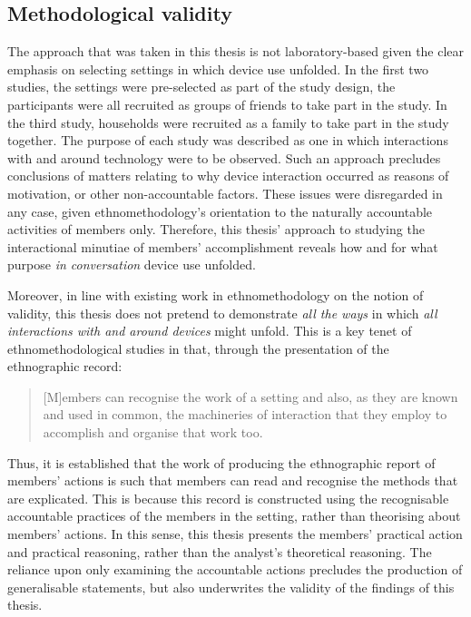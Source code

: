\subsection{Methodological validity}\label{sec:synopsis discussion method validity}
\begin{revisedsubmission}
The approach that was taken in this thesis is not laboratory-based given the clear emphasis on selecting settings in which device use unfolded.
In the first two studies, the settings were pre-selected as part of the study design, the participants were all recruited as groups of friends to take part in the study.
In the third study, households were recruited as a family to take part in the study together.
The purpose of each study was described as one in which interactions with and around technology were to be observed.
Such an approach precludes conclusions of matters relating to why device interaction occurred as reasons of motivation, or other non-accountable factors.
These issues were disregarded in any case, given ethnomethodology's orientation to the naturally accountable activities of members only.
Therefore, this thesis' approach to studying the interactional minutiae of members' accomplishment reveals how and for what purpose \textit{in conversation} device use unfolded.

Moreover, in line with existing work in ethnomethodology on the notion of validity, this thesis does not pretend to demonstrate \textit{all the ways} in which \textit{all interactions with and around devices} might unfold.
This is a key tenet of ethnomethodological studies in that, through the presentation of the ethnographic record:
\begin{quote}
    [M]embers can recognise the work of a setting and also, as they are known and used in common, the machineries of interaction that they employ to accomplish and organise that work too.
\end{quote}
Thus, it is established that the work of producing the ethnographic report of members' actions is such that members can read and recognise the methods that are explicated.
This is because this record is constructed using the recognisable accountable practices of the members in the setting, rather than theorising about members' actions.
In this sense, this thesis presents the members' practical action and practical reasoning, rather than the analyst's theoretical reasoning.
The reliance upon only examining the accountable actions precludes the production of generalisable statements, but also underwrites the validity of the findings of this thesis.


\end{revisedsubmission}
